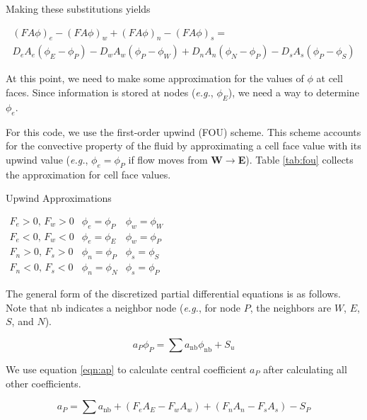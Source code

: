 \documentclass{article}
\newcommand{\lp}{\left(}
\newcommand{\rp}{\right)}
\begin{document}
Making these substitutions yields

\begin{multline}
   \lp FA\phi \rp_e - \lp FA\phi \rp_w + \lp FA\phi \rp_n - \lp FA\phi \rp_s = \\ D_e A_e \lp \phi_E - \phi_P \rp - D_w A_w \lp \phi_P - \phi_W \rp + D_n A_n \lp \phi_N - \phi_P \rp - D_s A_s \lp \phi_P - \phi_S \rp
\end{multline}

At this point, we need to make some approximation for the values of $\phi$ at cell faces. Since information is stored at nodes (\textit{e.g.}, $\phi_E$), we need a way to determine $\phi_e$.

For this code, we use the first-order upwind (FOU) scheme. This scheme accounts for the convective property of the fluid by approximating a cell face value with its upwind value (\textit{e.g.}, $\phi_e = \phi_P$ if flow moves from \textbf{W}$\rightarrow$\textbf{E}). Table \ref{tab:fou} collects the approximation for cell face values. 

\begin{table}[!ht]
\caption{Upwind Approximations}
\centering
$\begin{array}{lcc} \hline
     F_e > 0,\, F_w > 0 & \phi_e = \phi_P & \phi_w = \phi_W \\
     F_e < 0,\, F_w < 0 & \phi_e = \phi_E & \phi_w = \phi_P \\
     F_n > 0,\, F_s > 0 & \phi_n = \phi_P & \phi_s = \phi_S \\
     F_n < 0,\, F_s < 0 & \phi_n = \phi_N & \phi_s = \phi_P 
\end{array}$
\label{tab:fou}
\end{table}

The general form of the discretized partial differential equations is as follows. Note that $\mathrm{nb}$ indicates a neighbor node (\textit{e.g.}, for node $P$, the neighbors are $W$, $E$, $S$, and $N$). 

\begin{equation}
   a_P \phi_P = \sum a_{\mathrm{nb}} \phi_{\mathrm{nb}} + S_u
   \label{eqn:ap_phip}
\end{equation}

We use equation \ref{eqn:ap} to calculate central coefficient $a_P$ after calculating all other coefficients.

\begin{equation}
   a_P = \sum a_{\mathrm{nb}} + \lp F_e A_E - F_w A_w \rp + \lp F_n A_n - F_s A_s \rp - S_P
   \label{eqn:ap}
\end{equation}
\end{document}
